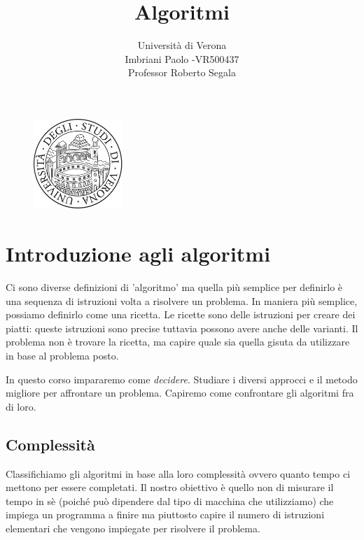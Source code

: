\documentclass[a4paper]{article}
\title{Algoritmi}
\author{Università di Verona\\Imbriani Paolo -VR500437\\Professor Roberto Segala}
\begin{document}
\begin{figure}
    \centering
    \includegraphics[width=0.3\textwidth]{UniversityofVerona.png}
    \label{fig:centered-image}
\end{figure}

\maketitle

\pagebreak

\tableofcontents

\pagebreak

\section{Introduzione agli algoritmi}


Ci sono diverse definizioni di 'algoritmo' ma quella più semplice per definirlo è una sequenza di istruzioni volta a risolvere un problema. In maniera più semplice, possiamo definirlo come una ricetta. Le ricette sono delle istruzioni per creare dei piatti: queste istruzioni sono precise tuttavia possono avere anche delle varianti. Il problema non è trovare la ricetta, ma capire quale sia quella gisuta da utilizzare in base al problema posto.

\vspace{1em}
\noindent
In questo corso impararemo come \textit{decidere}. Studiare i diversi approcci e il metodo migliore per affrontare un problema.
Capiremo come confrontare gli algoritmi fra di loro.

\subsection{Complessità}

Classifichiamo gli algoritmi in base alla loro complessità ovvero quanto tempo ci mettono per essere completati. Il nostro obiettivo è quello non di misurare il tempo in sè (poiché può dipendere dal tipo di macchina che utilizziamo) 
che impiega un programma a finire ma piuttosto capire il numero di istruzioni elementari che vengono impiegate per risolvere il problema.
\end{document}
